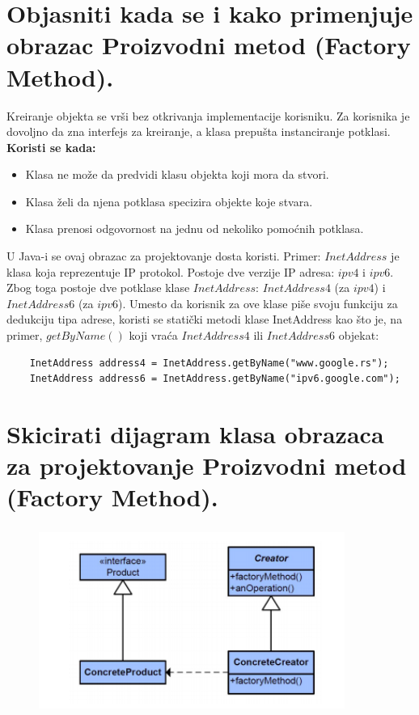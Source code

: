 \documentclass[a4paper]{article}
\begin{document}
\section{Objasniti kada se i kako primenjuje obrazac Proizvodni metod (Factory Method).}
  Kreiranje objekta se vrši bez otkrivanja implementacije korisniku. Za korisnika je dovoljno
  da zna interfejs za kreiranje, a klasa prepušta instanciranje potklasi. \\
  \textbf{Koristi se kada:}
  \begin{itemize}
    \item Klasa ne može da predvidi klasu objekta koji mora da stvori.
    \item Klasa želi da njena potklasa specizira objekte koje stvara.
    \item Klasa prenosi odgovornost na jednu od nekoliko pomoćnih potklasa.
  \end{itemize}

  \indent U Java-i se ovaj obrazac za projektovanje dosta koristi. Primer: $InetAddress$ je klasa koja
  reprezentuje IP protokol. Postoje dve verzije IP adresa: $ipv4$ i $ipv6$. Zbog toga postoje
  dve potklase klase $InetAddress$: $InetAddress4$ (za $ipv4$) i $InetAddress6$ (za $ipv6$). Umesto
  da korisnik za ove klase piše svoju funkciju za dedukciju tipa adrese, koristi se 
  statički metodi klase InetAddress kao što je, na primer, $getByName()$ koji vraća $InetAddress4$
  ili $InetAddress6$ objekat:
  \begin{lstlisting}
    InetAddress address4 = InetAddress.getByName("www.google.rs");
    InetAddress address6 = InetAddress.getByName("ipv6.google.com");\end{lstlisting}

\section{Skicirati dijagram klasa obrazaca za projektovanje Proizvodni metod (Factory Method).}
  \begin{figure}[H]
    \begin{center}
        \includegraphics[width=100mm,height=60mm]{Slike/dp_factory_method.png}
    \end{center}
  \end{figure} 
\end{document}
